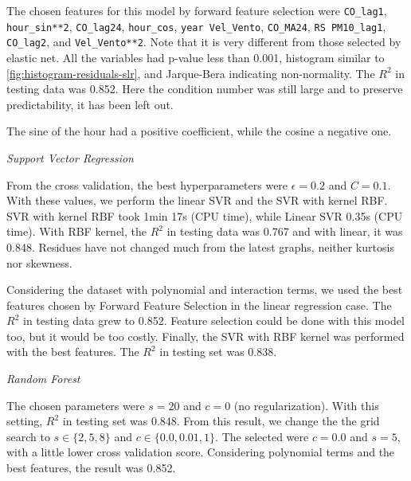 \vspace{2mm}

The chosen features for this model by forward feature selection were {\tt CO\_lag1}, {\tt hour\_sin**2},
{\tt CO\_lag24}, {\tt hour\_cos}, {\tt year Vel\_Vento}, {\tt CO\_MA24}, {\tt RS PM10\_lag1}, {\tt CO\_lag2}, and {\tt Vel\_Vento**2}. Note that it is
very different from those selected by elastic net. All the variables had
p-value less than 0.001, histogram similar to
\ref{fig:histogram-residuals-slr}, and Jarque-Bera indicating non-normality.
The $R^2$ in testing data was 0.852. Here the condition number was still large
and to preserve predictability, it has been left out. 

\begin{remark}
    The sine of the hour had a positive coefficient, while the cosine a
    negative one. 
\end{remark}

\vspace{2mm}

{\em Support Vector Regression}

\vspace{2mm}

From the cross validation, the best hyperparameters were
$\epsilon = 0.2$ and $C = 0.1$. With these values, we perform the linear SVR and
the SVR with kernel RBF. SVR with kernel RBF took 1min 17s (CPU time), while Linear SVR 0.35s (CPU time). With RBF kernel, the $R^2$ in testing data was 0.767 and
with linear, it was 0.848. Residues have not changed
much from the latest graphs, neither kurtosis nor skewness.

Considering the dataset with polynomial and interaction terms, we used the
best features chosen by Forward Feature Selection in the linear regression case. The
$R^2$ in testing data grew to 0.852. Feature selection could be done with this model too, but it would be
too costly. Finally, the SVR with RBF kernel was performed with the best
features. The $R^2$ in testing set was 0.838. 

\vspace{2mm}

{\em Random Forest} 

\vspace{2mm}

The chosen parameters were $s = 20$ and $c = 0$ (no regularization).
With this setting, $R^2$ in testing set was 0.848. From this result, we change
the the grid search to $s \in
\{2, 5, 8\}$ and $c \in \{0.0, 0.01, 1\}$. The selected were $c =
0.0$ and $s = 5$, with a little lower cross validation score. Considering
polynomial terms and the best features, the result was 0.852. 

